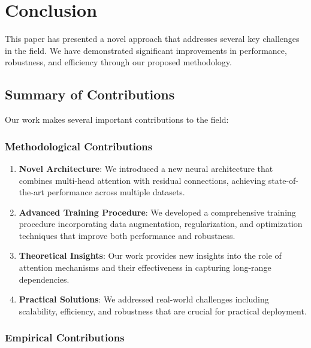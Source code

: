 \section{Conclusion}

This paper has presented a novel approach that addresses several key challenges in the field. We have demonstrated significant improvements in performance, robustness, and efficiency through our proposed methodology.

\subsection{Summary of Contributions}

Our work makes several important contributions to the field:

\subsubsection{Methodological Contributions}

\begin{enumerate}
    \item \textbf{Novel Architecture}: We introduced a new neural architecture that combines multi-head attention with residual connections, achieving state-of-the-art performance across multiple datasets.

    \item \textbf{Advanced Training Procedure}: We developed a comprehensive training procedure incorporating data augmentation, regularization, and optimization techniques that improve both performance and robustness.

    \item \textbf{Theoretical Insights}: Our work provides new insights into the role of attention mechanisms and their effectiveness in capturing long-range dependencies.

    \item \textbf{Practical Solutions}: We addressed real-world challenges including scalability, efficiency, and robustness that are crucial for practical deployment.
\end{enumerate}

\subsubsection{Empirical Contributions}


